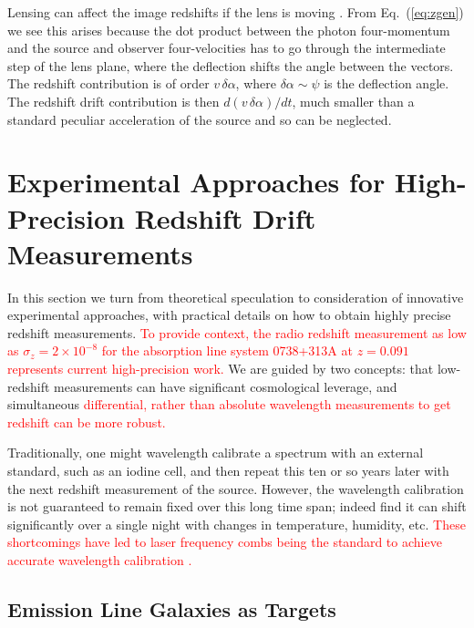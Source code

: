 \documentclass[preprint2, 10pt]{aastex}
\begin{document}
Lensing can affect the image redshifts if the lens is moving 
\citep{mitrofanov,birkgull}.  From 
Eq.~(\ref{eq:zgen}) we see this arises because the dot product between 
the photon four-momentum and the source and observer four-velocities 
has to go through the intermediate step of the lens plane, where the 
deflection shifts the angle between the vectors.  The redshift contribution 
is of order $v\,\delta\alpha$, where $\delta\alpha\sim\psi$ is the 
deflection angle.  The redshift drift contribution is then 
$d(v\,\delta\alpha)/dt$, much smaller than a standard peculiar 
acceleration of the source and so can be neglected. 



\section{Experimental Approaches for High-Precision Redshift Drift Measurements} \label{sec:tech} 

In this section we turn from theoretical speculation to consideration of 
innovative experimental approaches, with practical details on how to 
obtain highly precise redshift measurements. 
\textcolor{red}{
To provide context, the radio redshift measurement as low as 
$\sigma_z=2\times 10^{-8}$ for the absorption line system 0738+313A at $z=0.091$
\citep{2012ApJ...761L..26D} represents current high-precision 
work.}
We are guided by two concepts: 
that low-redshift measurements can have significant cosmological leverage, 
and simultaneous
\textcolor{red}
{differential, rather than absolute wavelength measurements
to get redshift can be more robust.}

Traditionally, one might wavelength calibrate a spectrum with an external 
standard, such as an iodine cell, and then repeat this ten or so years 
later with the next redshift measurement of the source.  However, the 
wavelength calibration is not guaranteed to remain fixed over this long time 
span; indeed \citet{griest1,griest2} find it can shift significantly over a 
single night with changes in temperature, humidity, etc.  
\textcolor{red}{These shortcomings have led to 
laser frequency combs being the standard to achieve accurate wavelength calibration
\citep{2007MNRAS.380..839M,2008Sci...321.1335S,2012Natur.485..611W}.}


\subsection{Emission Line Galaxies as Targets} 
\end{document}
